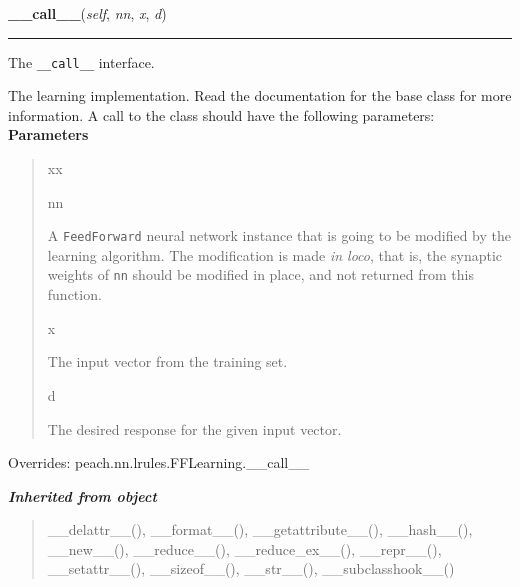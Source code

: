 \hspace{.8\funcindent}\begin{boxedminipage}{\funcwidth}

    \raggedright \textbf{\_\_call\_\_}(\textit{self}, \textit{nn}, \textit{x}, \textit{d})

    \vspace{-1.5ex}

    \rule{\textwidth}{0.5\fboxrule}
\setlength{\parskip}{2ex}

The \texttt{\_\_call\_\_} interface.

The learning implementation. Read the documentation for the base class
for more information. A call to the class should have the following
parameters:
\setlength{\parskip}{1ex}
      \textbf{Parameters}
      \vspace{-1ex}

      \begin{quote}
        \begin{Ventry}{xx}

          \item[nn]


A \texttt{FeedForward} neural network instance that is going to be
modified by the learning algorithm. The modification is made \emph{in
loco}, that is, the synaptic weights of \texttt{nn} should be modified
in place, and not returned from this function.
          \item[x]


The input vector from the training set.
          \item[d]


The desired response for the given input vector.
        \end{Ventry}

      \end{quote}

      Overrides: peach.nn.lrules.FFLearning.\_\_call\_\_

    \end{boxedminipage}


\large{\textbf{\textit{Inherited from object}}}

\begin{quote}
\_\_delattr\_\_(), \_\_format\_\_(), \_\_getattribute\_\_(), \_\_hash\_\_(), \_\_new\_\_(), \_\_reduce\_\_(), \_\_reduce\_ex\_\_(), \_\_repr\_\_(), \_\_setattr\_\_(), \_\_sizeof\_\_(), \_\_str\_\_(), \_\_subclasshook\_\_()
\end{quote}


